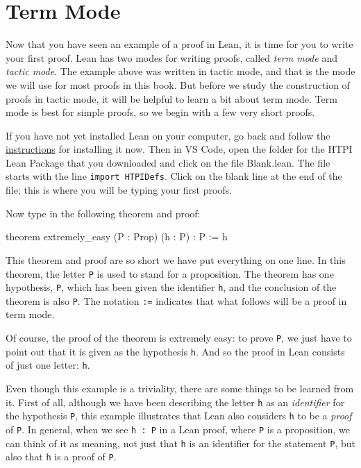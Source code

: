\documentclass[
  letterpaper,
  DIV=11,
  numbers=noendperiod]{scrreprt}
\newenvironment{Shaded}{\begin{snugshade}}{\end{snugshade}}
\newcommand{\KeywordTok}[1]{\textcolor[rgb]{0.00,0.23,0.31}{#1}}
\newcommand{\NormalTok}[1]{\textcolor[rgb]{0.00,0.23,0.31}{#1}}
\renewcommand{\NormalTok}[1]{\textcolor[HTML]{000000}{#1}}
\renewcommand{\KeywordTok}[1]{\textcolor[HTML]{0000FF}{#1}}
\begin{document}
\hypertarget{term-mode}{%
\section*{Term Mode}\label{term-mode}}

Now that you have seen an example of a proof in Lean, it is time for you
to write your first proof. Lean has two modes for writing proofs, called
\emph{term mode} and \emph{tactic mode}. The example above was written
in tactic mode, and that is the mode we will use for most proofs in this
book. But before we study the construction of proofs in tactic mode, it
will be helpful to learn a bit about term mode. Term mode is best for
simple proofs, so we begin with a few very short proofs.

If you have not yet installed Lean on your computer, go back and follow
the \protect\hyperlink{installing-lean}{instructions} for installing it
now. Then in VS Code, open the folder for the HTPI Lean Package that you
downloaded and click on the file Blank.lean. The file starts with the
line \texttt{import\ HTPIDefs}. Click on the blank line at the end of
the file; this is where you will be typing your first proofs.

Now type in the following theorem and proof:

\begin{Shaded}
\begin{Highlighting}[]
\KeywordTok{theorem}\NormalTok{ extremely\_easy (P : }\KeywordTok{Prop}\NormalTok{) (h : P) : P := h}
\end{Highlighting}
\end{Shaded}

This theorem and proof are so short we have put everything on one line.
In this theorem, the letter \texttt{P} is used to stand for a
proposition. The theorem has one hypothesis, \texttt{P}, which has been
given the identifier \texttt{h}, and the conclusion of the theorem is
also \texttt{P}. The notation \texttt{:=} indicates that what follows
will be a proof in term mode.

Of course, the proof of the theorem is extremely easy: to prove
\texttt{P}, we just have to point out that it is given as the hypothesis
\texttt{h}. And so the proof in Lean consists of just one letter:
\texttt{h}.

Even though this example is a triviality, there are some things to be
learned from it. First of all, although we have been describing the
letter \texttt{h} as an \emph{identifier} for the hypothesis \texttt{P},
this example illustrates that Lean also considers \texttt{h} to be a
\emph{proof} of \texttt{P}. In general, when we see \texttt{h\ :\ P} in
a Lean proof, where \texttt{P} is a proposition, we can think of it as
meaning, not just that \texttt{h} is an identifier for the statement
\texttt{P}, but also that \texttt{h} is a proof of \texttt{P}.
\end{document}
